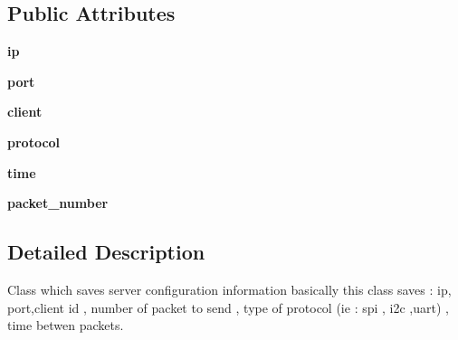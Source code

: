 \subsection*{Public Attributes}
\begin{DoxyCompactItemize}
\item 
\hypertarget{classConfigurationServer_1_1ConfigurationServer_af1cf7c8205196617538cda394c23dc36}{{\bfseries ip}}\label{classConfigurationServer_1_1ConfigurationServer_af1cf7c8205196617538cda394c23dc36}

\item 
\hypertarget{classConfigurationServer_1_1ConfigurationServer_a273ae6faff39e5c0e39670400389ee4d}{{\bfseries port}}\label{classConfigurationServer_1_1ConfigurationServer_a273ae6faff39e5c0e39670400389ee4d}

\item 
\hypertarget{classConfigurationServer_1_1ConfigurationServer_ae9dbf586052f3dab5622569ea91b92e0}{{\bfseries client}}\label{classConfigurationServer_1_1ConfigurationServer_ae9dbf586052f3dab5622569ea91b92e0}

\item 
\hypertarget{classConfigurationServer_1_1ConfigurationServer_a50803dd30c7d0b48acf6c7a34d3f5d8c}{{\bfseries protocol}}\label{classConfigurationServer_1_1ConfigurationServer_a50803dd30c7d0b48acf6c7a34d3f5d8c}

\item 
\hypertarget{classConfigurationServer_1_1ConfigurationServer_a8fa3da69a96d847f1234e36b0777993e}{{\bfseries time}}\label{classConfigurationServer_1_1ConfigurationServer_a8fa3da69a96d847f1234e36b0777993e}

\item 
\hypertarget{classConfigurationServer_1_1ConfigurationServer_ad781234144b1e02d5f7d2c57b02b676f}{{\bfseries packet\+\_\+number}}\label{classConfigurationServer_1_1ConfigurationServer_ad781234144b1e02d5f7d2c57b02b676f}

\end{DoxyCompactItemize}


\subsection{Detailed Description}
Class which saves server configuration information basically this class saves \+: ip, port,client id , number of packet to send , type of protocol (ie \+: spi , i2c ,uart) , time betwen packets. 

